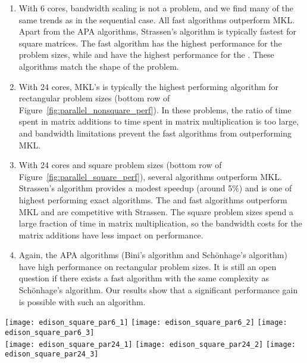 \documentclass[preprint]{sigplanconf}
\begin{document}
\begin{enumerate}
\item
With 6 cores, bandwidth scaling is not a problem, and we find many of the same trends as in the sequential case.
All fast algorithms outperform MKL.
Apart from the APA algorithms, Strassen's algorithm is typically fastest for square matrices.
The  fast algorithm has the highest performance for the  problem sizes, 
while  and  have the highest performance for the .
These algorithms match the shape of the problem.

\item
With 24 cores, MKL's  is typically the highest performing algorithm for rectangular problem sizes (bottom row of Figure~\ref{fig:parallel_nonsquare_perf}).
In these problems, the ratio of time spent in matrix additions to time spent in matrix multiplication is too large, and bandwidth limitations prevent the fast algorithms from outperforming MKL.

\item 
With 24 cores and square problem sizes (bottom row of Figure~\ref{fig:parallel_square_perf}),
several algorithms outperform MKL.
Strassen's algorithm provides a modest speedup (around 5\%) and is one of highest performing exact algorithms.
The  and  fast algorithms outperform MKL and are competitive with Strassen.
The square problem sizes spend a large fraction of time in matrix multiplication, so the bandwidth costs for the matrix additions have less impact on performance.

\item
Again, the APA algorithms (Bini's algorithm and Sch\"{o}nhage's algorithm) have high performance on rectangular problem sizes.
It is still an open question if there exists a fast algorithm with the same complexity as Sch\"{o}nhage's algorithm.
Our results show that a significant performance gain is possible with such an algorithm.

\end{enumerate}

\begin{figure*}[tb]
\centering
\texttt{[image: edison\_square\_par6\_1]}
\texttt{[image: edison\_square\_par6\_2]}
\texttt{[image: edison\_square\_par6\_3]} \\
\texttt{[image: edison\_square\_par24\_1]}
\texttt{[image: edison\_square\_par24\_2]}
\texttt{[image: edison\_square\_par24\_3]}
\caption{
Effective parallel performance (Equation~\eqref{eqn:eff_perf}) of fast algorithms on square problems using only 6 cores (top row) and all 24 cores (bottom row).
With 6 cores, bandwidth is not a bottleneck and we see similar trends to the sequential algorithms.
With 24 cores, speedups over MKL are less dramatic, but Strassen (bottom left),  (bottom left), and  (bottom right) all outperform MKL and have similar performance.
Bini and Sch\"{o}hage have high performance, but they are APA algorithms and suffer from severe numerical problems.
}
\label{fig:parallel_square_perf}
\end{figure*}
\end{document}
